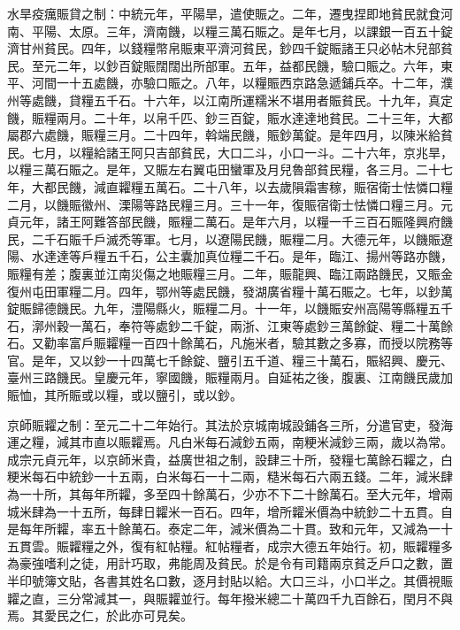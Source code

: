 \begin{pinyinscope}
 水旱疫癘賑貸之制：中統元年，平陽旱，遣使賑之。二年，遷曳捏即地貧民就食河南、平陽、太原。三年，濟南饑，以糧三萬石賑之。是年七月，以課銀一百五十錠濟甘州貧民。四年，以錢糧幣帛賑東平濟河貧民，鈔四千錠賑諸王只必帖木兒部貧民。至元二年，以鈔百錠賑闊闊出所部軍。五年，益都民饑，驗口賑之。六年，東平、河間一十五處饑，亦驗口賑之。八年，以糧賑西京路急遞鋪兵卒。十二年，濮州等處饑，貸糧五千石。十六年，以江南所運糯米不堪用者賑貧民。十九年，真定饑，賑糧兩月。二十年，以帛千匹、鈔三百錠，賑水達達地貧民。二十三年，大都屬郡六處饑，賑糧三月。二十四年，斡端民饑，賑鈔萬錠。是年四月，以陳米給貧民。七月，以糧給諸王阿只吉部貧民，大口二斗，小口一斗。二十六年，京兆旱，以糧三萬石賑之。是年，又賑左右翼屯田蠻軍及月兒魯部貧民糧，各三月。二十七年，大都民饑，減直糶糧五萬石。二十八年，以去歲隕霜害稼，賑宿衛士怯憐口糧二月，以饑賑徽州、溧陽等路民糧三月。三十一年，復賑宿衛士怯憐口糧三月。元貞元年，諸王阿難答部民饑，賑糧二萬石。是年六月，以糧一千三百石賑隆興府饑民，二千石賑千戶滅禿等軍。七月，以遼陽民饑，賑糧二月。大德元年，以饑賑遼陽、水達達等戶糧五千石，公主囊加真位糧二千石。是年，臨江、揚州等路亦饑，賑糧有差；腹裏並江南災傷之地賑糧三月。二年，賑龍興、臨江兩路饑民，又賑金復州屯田軍糧二月。四年，鄂州等處民饑，發湖廣省糧十萬石賑之。七年，以鈔萬錠賑歸德饑民。九年，澧陽縣火，賑糧二月。十一年，以饑賑安州高陽等縣糧五千石，漷州穀一萬石，奉符等處鈔二千錠，兩浙、江東等處鈔三萬餘錠、糧二十萬餘石。又勸率富戶賑糶糧一百四十餘萬石，凡施米者，驗其數之多寡，而授以院務等官。是年，又以鈔一十四萬七千餘錠、鹽引五千道、糧三十萬石，賑紹興、慶元、臺州三路饑民。皇慶元年，寧國饑，賑糧兩月。自延祐之後，腹裏、江南饑民歲加賑恤，其所賑或以糧，或以鹽引，或以鈔。



 京師賑糶之制：至元二十二年始行。其法於京城南城設鋪各三所，分遣官吏，發海運之糧，減其市直以賑糶焉。凡白米每石減鈔五兩，南粳米減鈔三兩，歲以為常。成宗元貞元年，以京師米貴，益廣世祖之制，設肆三十所，發糧七萬餘石糶之，白粳米每石中統鈔一十五兩，白米每石一十二兩，糙米每石六兩五錢。二年，減米肆為一十所，其每年所糶，多至四十餘萬石，少亦不下二十餘萬石。至大元年，增兩城米肆為一十五所，每肆日糶米一百石。四年，增所糶米價為中統鈔二十五貫。自是每年所糶，率五十餘萬石。泰定二年，減米價為二十貫。致和元年，又減為一十五貫雲。賑糶糧之外，復有紅帖糧。紅帖糧者，成宗大德五年始行。初，賑糶糧多為豪強嗜利之徒，用計巧取，弗能周及貧民。於是令有司籍兩京貧乏戶口之數，置半印號簿文貼，各書其姓名口數，逐月封貼以給。大口三斗，小口半之。其價視賑糶之直，三分常減其一，與賑糶並行。每年撥米總二十萬四千九百餘石，閏月不與焉。其愛民之仁，於此亦可見矣。




\end{pinyinscope}
